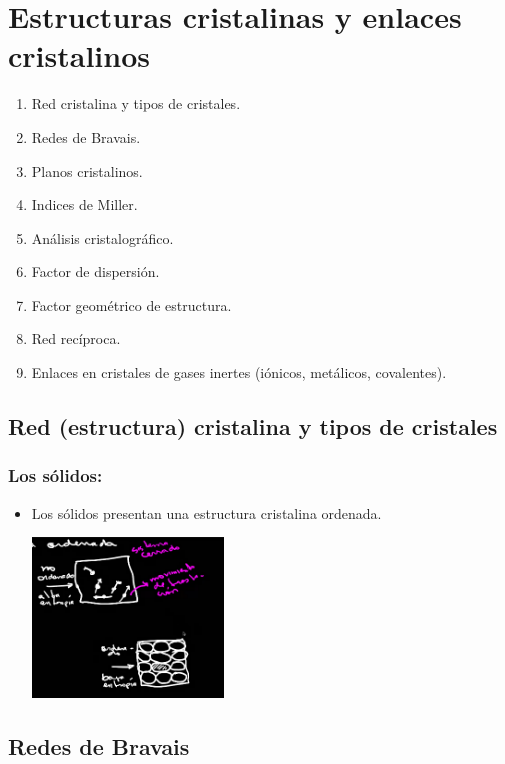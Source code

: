 \chapter{Estructuras cristalinas y enlaces cristalinos}

\begin{enumerate}
    \item Red cristalina y tipos de cristales.
    \item Redes de Bravais.
    \item Planos cristalinos.
    \item Indices de Miller.
    \item Análisis cristalográfico.
    \item Factor de dispersión.
    \item Factor geométrico de estructura.
    \item Red recíproca.
    \item Enlaces en cristales de gases inertes (iónicos, metálicos, covalentes).
\end{enumerate}

\section{Red (estructura) cristalina y tipos de cristales}

\subsection{Los sólidos:}
\begin{itemize}
    \item Los sólidos presentan una estructura cristalina ordenada.
    
    \includegraphics[width=0.4\textwidth]{Graficas/Aug17-1.png}
\end{itemize}

\section{Redes de Bravais}

